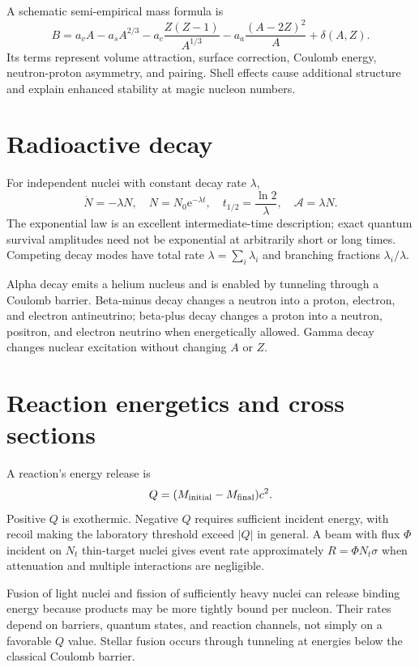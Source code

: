 \documentclass[11pt,oneside]{book}
\newcommand{\ee}{\mathrm{e}}
\theoremstyle{reviewstyle}
\begin{document}
A schematic semi-empirical mass formula is
\begin{equation}B=a_vA-a_sA^{2/3}-a_c\frac{Z(Z-1)}{A^{1/3}}-a_a\frac{(A-2Z)^2}{A}+\delta(A,Z).\end{equation}
Its terms represent volume attraction, surface correction, Coulomb energy, neutron-proton asymmetry, and pairing. Shell effects cause additional structure and explain enhanced stability at magic nucleon numbers.
\section{Radioactive decay}
For independent nuclei with constant decay rate $\lambda$,
\begin{equation}\dot N=-\lambda N,\quad N=N_0\ee^{-\lambda t},\quad t_{1/2}=\frac{\ln2}{\lambda},\quad \mathcal A=\lambda N.\end{equation}
The exponential law is an excellent intermediate-time description; exact quantum survival amplitudes need not be exponential at arbitrarily short or long times. Competing decay modes have total rate $\lambda=\sum_i\lambda_i$ and branching fractions $\lambda_i/\lambda$.

Alpha decay emits a helium nucleus and is enabled by tunneling through a Coulomb barrier. Beta-minus decay changes a neutron into a proton, electron, and electron antineutrino; beta-plus decay changes a proton into a neutron, positron, and electron neutrino when energetically allowed. Gamma decay changes nuclear excitation without changing $A$ or $Z$.
\section{Reaction energetics and cross sections}
A reaction's energy release is
\begin{equation}Q=(M_{\rm initial}-M_{\rm final})c^2.\end{equation}
Positive $Q$ is exothermic. Negative $Q$ requires sufficient incident energy, with recoil making the laboratory threshold exceed $|Q|$ in general. A beam with flux $\Phi$ incident on $N_t$ thin-target nuclei gives event rate approximately $R=\Phi N_t\sigma$ when attenuation and multiple interactions are negligible.

Fusion of light nuclei and fission of sufficiently heavy nuclei can release binding energy because products may be more tightly bound per nucleon. Their rates depend on barriers, quantum states, and reaction channels, not simply on a favorable $Q$ value. Stellar fusion occurs through tunneling at energies below the classical Coulomb barrier.
\end{document}
